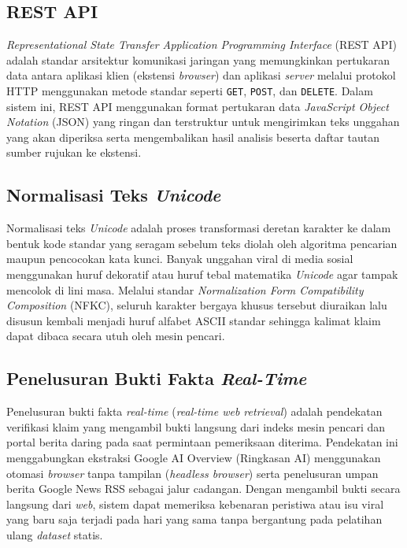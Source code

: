 \documentclass[12pt,a4paper,twoside]{report}
\begin{document}
\subsection{REST API}

\textit{Representational State Transfer Application Programming Interface} (REST API) adalah standar arsitektur komunikasi jaringan yang memungkinkan pertukaran data antara aplikasi klien (ekstensi \textit{browser}) dan aplikasi \textit{server} melalui protokol HTTP menggunakan metode standar seperti \texttt{GET}, \texttt{POST}, dan \texttt{DELETE}. Dalam sistem ini, REST API menggunakan format pertukaran data \textit{JavaScript Object Notation} (JSON) yang ringan dan terstruktur untuk mengirimkan teks unggahan yang akan diperiksa serta mengembalikan hasil analisis beserta daftar tautan sumber rujukan ke ekstensi.

\subsection{Normalisasi Teks \textit{Unicode}}

Normalisasi teks \textit{Unicode} adalah proses transformasi deretan karakter ke dalam bentuk kode standar yang seragam sebelum teks diolah oleh algoritma pencarian maupun pencocokan kata kunci. Banyak unggahan viral di media sosial menggunakan huruf dekoratif atau huruf tebal matematika \textit{Unicode} agar tampak mencolok di lini masa. Melalui standar \textit{Normalization Form Compatibility Composition} (NFKC), seluruh karakter bergaya khusus tersebut diuraikan lalu disusun kembali menjadi huruf alfabet ASCII standar sehingga kalimat klaim dapat dibaca secara utuh oleh mesin pencari.

\subsection{Penelusuran Bukti Fakta \textit{Real-Time}}

Penelusuran bukti fakta \textit{real-time} (\textit{real-time web retrieval}) adalah pendekatan verifikasi klaim yang mengambil bukti langsung dari indeks mesin pencari dan portal berita daring pada saat permintaan pemeriksaan diterima. Pendekatan ini menggabungkan ekstraksi Google AI Overview (Ringkasan AI) menggunakan otomasi \textit{browser} tanpa tampilan (\textit{headless browser}) serta penelusuran umpan berita Google News RSS sebagai jalur cadangan. Dengan mengambil bukti secara langsung dari \textit{web}, sistem dapat memeriksa kebenaran peristiwa atau isu viral yang baru saja terjadi pada hari yang sama tanpa bergantung pada pelatihan ulang \textit{dataset} statis.
\end{document}
